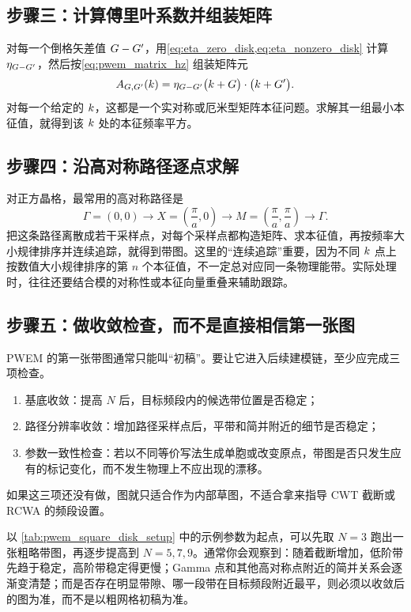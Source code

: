 \subsection{步骤三：计算傅里叶系数并组装矩阵}
对每一个倒格矢差值 $G-G'$，用\cref{eq:eta_zero_disk,eq:eta_nonzero_disk} 计算 $\eta_{G-G'}$，然后按\cref{eq:pwem_matrix_hz} 组装矩阵元
\begin{equation}
A_{G,G'}(k)
=
\eta_{G-G'}
\bigl(k+G\bigr)\cdot\bigl(k+G'\bigr).
\label{eq:pwem_matrix_element_explicit}
\end{equation}
对每一个给定的 $k$，这都是一个实对称或厄米型矩阵本征问题。求解其一组最小本征值，就得到该 $k$ 处的本征频率平方。

\subsection{步骤四：沿高对称路径逐点求解}
对正方晶格，最常用的高对称路径是
\begin{equation}
\Gamma=(0,0)
\rightarrow
X=\left(\frac{\pi}{a},0\right)
\rightarrow
M=\left(\frac{\pi}{a},\frac{\pi}{a}\right)
\rightarrow
\Gamma.
\label{eq:gxmg_path_pwem}
\end{equation}
把这条路径离散成若干采样点，对每个采样点都构造矩阵、求本征值，再按频率大小规律排序并连续追踪，就得到带图。这里的“连续追踪”重要，因为不同 $k$ 点上按数值大小规律排序的第 $n$ 个本征值，不一定总对应同一条物理能带。实际处理时，往往还要结合模的对称性或本征向量重叠来辅助跟踪。

\subsection{步骤五：做收敛检查，而不是直接相信第一张图}
PWEM 的第一张带图通常只能叫“初稿”。要让它进入后续建模链，至少应完成三项检查。
\begin{enumerate}
  \item 基底收敛：提高 $N$ 后，目标频段内的候选带位置是否稳定；
  \item 路径分辨率收敛：增加路径采样点后，平带和简并附近的细节是否稳定；
  \item 参数一致性检查：若以不同等价写法生成单胞或改变原点，带图是否只发生应有的标记变化，而不发生物理上不应出现的漂移。
\end{enumerate}
如果这三项还没有做，图就只适合作为内部草图，不适合拿来指导 CWT 截断或 RCWA 的频段设置。

以 \cref{tab:pwem_square_disk_setup} 中的示例参数为起点，可以先取 $N=3$ 跑出一张粗略带图，再逐步提高到 $N=5,7,9$。通常你会观察到：随着截断增加，低阶带先趋于稳定，高阶带稳定得更慢；Gamma 点和其他高对称点附近的简并关系会逐渐变清楚；而是否存在明显带隙、哪一段带在目标频段附近最平，则必须以收敛后的图为准，而不是以粗网格初稿为准。

